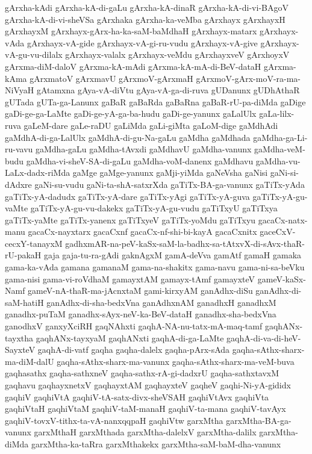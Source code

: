 {gArxha-kAdi
gArxha-kA-di-gaLu
gArxha-kA-dinaR
gArxha-kA-di-vi-BAgoV
gArxha-kA-di-vi-sheVSa
gArxhaka
gArxha-ka-veMba
gArxhayx
gArxhayxH
gArxhayxM
gArxhayx-gArx-ha-ka-saM-baMdhaH
gArxhayx-matarx
gArxhayx-vAda
gArxhayx-vA-gide
gArxhayx-vA-gi-ru-vudu
gArxhayx-vA-give
gArxhayx-vA-gu-vu-dilalx
gArxhayx-valalx
gArxhayx-veMdu
gArxhayxveV
gArxhoyxV
gArxma-diM-daloV
gArxma-kA-mAdi
gArxma-kA-mA-di-BeV-dataH
gArxma-kAma
gArxmatoV
gArxmavU
gArxmoV-gArxmaH
gArxmoV-gArx-moV-ra-ma-NiVyaH
gAtamxna
gAya-vA-diVtu
gAya-vA-ga-di-ruva
gUDanunx
gUDhAthaR
gUTada
gUTa-ga-Lanunx
gaBaR
gaBaRda
gaBaRna
gaBaR-rU-pa-diMda
gaDige
gaDi-ge-ga-LaMte
gaDi-ge-yA-ga-ba-hudu
gaDi-ge-yanunx
gaLalUlx
gaLa-lilx-ruva
gaLeM-dare
gaLe-raDU
gaLiMda
gaLi-giMta
gaLoM-dige
gaMdhAdi
gaMdhA-di-ga-LalUlx
gaMdhA-di-gu-Na-gaLu
gaMdha
gaMdhada
gaMdha-ga-Li-ru-vavu
gaMdha-gaLu
gaMdha-tAvxdi
gaMdhavU
gaMdha-vanunx
gaMdha-veM-budu
gaMdha-vi-sheV-SA-di-gaLu
gaMdha-voM-danenx
gaMdhavu
gaMdha-vu-LaLx-dadx-riMda
gaMge
gaMge-yanunx
gaMji-yiMda
gaNeVsha
gaNisi
gaNi-si-dAdxre
gaNi-su-vudu
gaNi-ta-shA-satxrXda
gaTiTx-BA-ga-vanunx
gaTiTx-yAda
gaTiTx-yA-dadudx
gaTiTx-yA-dare
gaTiTx-yAgi
gaTiTx-yA-guva
gaTiTx-yA-gu-vaMte
gaTiTx-yA-gu-vu-dakekx
gaTiTx-yA-gu-vudu
gaTiTxyU
gaTiTxya
gaTiTx-yaMte
gaTiTx-yanenx
gaTiTxyeV
gaTiTx-yoMdu
gaTiTxyu
gacaCx-natx-manu
gacaCx-nayxtarx
gacaCxnf
gacaCx-nf-shi-bi-kayA
gacaCxnitx
gaceCxV-cecxY-tanayxM
gadhxmAR-na-peV-kaSx-saM-la-badhx-sa-tAtxvX-di-sAvx-thaR-rU-pakaH
gaja
gaja-tu-ra-gAdi
gaknAgxM
gamA-deVva
gamAtf
gamaH
gamaka
gama-ka-vAda
gamana
gamanaM
gama-na-shakitx
gama-navu
gama-ni-sa-beVku
gama-nisi
gama-vi-roVdhaM
gamayxtAM
gamayx-tAmf
gamayxteV
gameV-kaSx-Namf
gameV-nA-thaR-ma-jAcnxtaM
gami-kirxyAM
ganAdhx-diSu
ganAdhx-di-saM-hatiH
ganAdhx-di-sha-bedxVna
ganAdhxnAM
ganadhxH
ganadhxM
ganadhx-puTaM
ganadhx-sAyx-neV-ka-BeV-dataH
ganadhx-sha-bedxVna
ganodhxV
ganxyXciRH
gaqNAhxti
gaqhA-NA-nu-tatx-mA-maq-tamf
gaqhANx-tayxtha
gaqhANx-tayxyaM
gaqhANxti
gaqhA-di-ga-LaMte
gaqhA-di-va-di-heV-SayxteV
gaqhA-di-vatf
gaqha
gaqha-dalelx
gaqha-pArx-sAda
gaqha-sAthx-sharx-ma-diM-dalU
gaqha-sAthx-sharx-ma-vanunx
gaqha-sAthx-sharx-ma-veM-buva
gaqhasathx
gaqha-sathxneV
gaqha-sathx-rA-gi-dadxrU
gaqha-sathxtavxM
gaqhavu
gaqhayxnetxV
gaqhayxtAM
gaqhayxteV
gaqheV
gaqhi-Ni-yA-gididx
gaqhiV
gaqhiVtA
gaqhiV-tA-satx-divx-sheVSAH
gaqhiVtAvx
gaqhiVta
gaqhiVtaH
gaqhiVtaM
gaqhiV-taM-manaH
gaqhiV-ta-mana
gaqhiV-tavAyx
gaqhiV-tovxV-tithx-ta-vA-nanxqqpaH
gaqhiVtw
garxMtha
garxMtha-BA-ga-vanunx
garxMthaH
garxMthada
garxMtha-dalelxV
garxMtha-dalilx
garxMtha-diMda
garxMtha-ka-taRra
garxMthakekx
garxMtha-saM-baM-dha-vanunx
}

